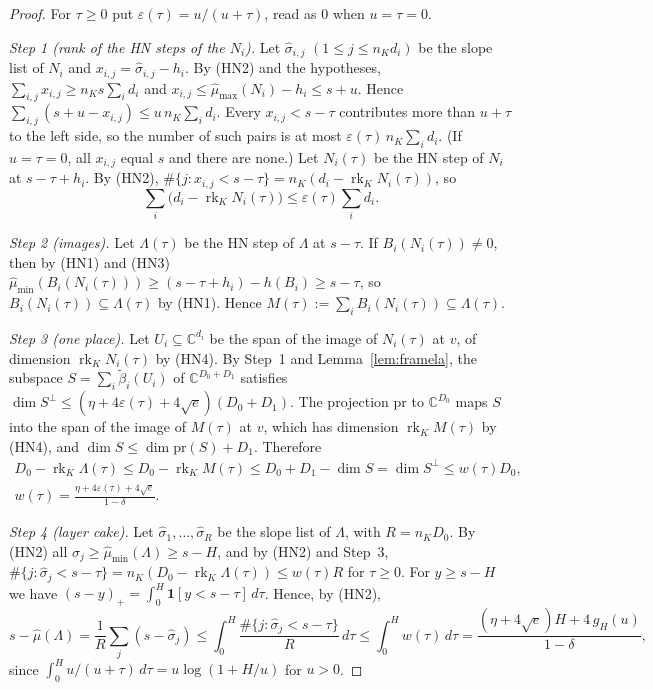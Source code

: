 \documentclass[11pt]{amsart}
\newcommand{\CC}{\mathbb{C}}
\DeclareMathOperator{\rk}{rk}
\theoremstyle{plain}
\theoremstyle{definition}
\numberwithin{equation}{section}
\begin{document}
\begin{proof}
For $\tau\ge0$ put $\varepsilon(\tau)=u/(u+\tau)$, read as $0$ when $u=\tau=0$.

\emph{Step 1 (rank of the HN steps of the $N_i$).} Let $\hat\sigma_{i,j}$ $(1\le j\le n_Kd_i)$ be the
slope list of $N_i$ and $x_{i,j}=\hat\sigma_{i,j}-h_i$. By (HN2) and the hypotheses,
$\sum_{i,j}x_{i,j}\ge n_Ks\sum_id_i$ and $x_{i,j}\le\hat\mu_{\max}(N_i)-h_i\le s+u$. Hence
$\sum_{i,j}(s+u-x_{i,j})\le u\,n_K\sum_id_i$. Every $x_{i,j}<s-\tau$ contributes more than $u+\tau$ to
the left side, so the number of such pairs is at most $\varepsilon(\tau)\,n_K\sum_id_i$. (If
$u=\tau=0$, all $x_{i,j}$ equal $s$ and there are none.) Let $N_i(\tau)$ be the HN step of $N_i$ at
$s-\tau+h_i$. By (HN2), $\#\{j:x_{i,j}<s-\tau\}=n_K(d_i-\rk_KN_i(\tau))$, so
\[
\textstyle\sum_i\bigl(d_i-\rk_KN_i(\tau)\bigr)\le\varepsilon(\tau)\sum_id_i.
\]

\emph{Step 2 (images).} Let $\Lambda(\tau)$ be the HN step of $\Lambda$ at $s-\tau$. If
$B_i(N_i(\tau))\ne0$, then by (HN1) and (HN3)
$\hat\mu_{\min}(B_i(N_i(\tau)))\ge(s-\tau+h_i)-h(B_i)\ge s-\tau$, so $B_i(N_i(\tau))\subseteq\Lambda(\tau)$
by (HN1). Hence $M(\tau):=\sum_iB_i(N_i(\tau))\subseteq\Lambda(\tau)$.

\emph{Step 3 (one place).} Let $U_i\subseteq\CC^{d_i}$ be the span of the image of $N_i(\tau)$ at $v$,
of dimension $\rk_KN_i(\tau)$ by (HN4). By Step~1 and Lemma~\ref{lem:framela}, the subspace
$S=\sum_i\tilde\beta_i(U_i)$ of $\CC^{D_0+D_1}$ satisfies
$\dim S^\perp\le(\eta+4\varepsilon(\tau)+4\sqrt e)(D_0+D_1)$. The projection $\mathrm{pr}$ to
$\CC^{D_0}$ maps $S$ into the span of the image of $M(\tau)$ at $v$, which has dimension $\rk_KM(\tau)$
by (HN4), and $\dim S\le\dim\mathrm{pr}(S)+D_1$. Therefore
\begin{gather*}
D_0-\rk_K\Lambda(\tau)\le D_0-\rk_KM(\tau)\le D_0+D_1-\dim S=\dim S^\perp\le w(\tau)D_0,\\
w(\tau)=\frac{\eta+4\varepsilon(\tau)+4\sqrt e}{1-\delta}.
\end{gather*}

\emph{Step 4 (layer cake).} Let $\hat\sigma_1,\dots,\hat\sigma_R$ be the slope list of $\Lambda$, with
$R=n_KD_0$. By (HN2) all $\hat\sigma_j\ge\hat\mu_{\min}(\Lambda)\ge s-H$, and by (HN2) and Step~3,
$\#\{j:\hat\sigma_j<s-\tau\}=n_K(D_0-\rk_K\Lambda(\tau))\le w(\tau)R$ for $\tau\ge0$. For $y\ge s-H$ we have
$(s-y)_+=\int_0^H\mathbf 1[y<s-\tau]\,d\tau$. Hence, by (HN2),
\[
s-\hat\mu(\Lambda)=\frac1R\sum_j(s-\hat\sigma_j)\le\int_0^H\frac{\#\{j:\hat\sigma_j<s-\tau\}}{R}\,d\tau\le\int_0^Hw(\tau)\,d\tau
=\frac{(\eta+4\sqrt e)H+4\,g_H(u)}{1-\delta},
\]
since $\int_0^Hu/(u+\tau)\,d\tau=u\log(1+H/u)$ for $u>0$.
\end{proof}
\end{document}
